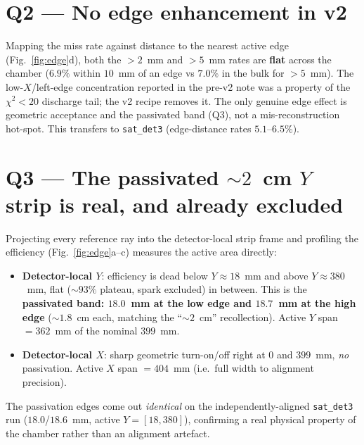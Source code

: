 \documentclass[11pt]{article}
\begin{document}
\section{Q2 --- No edge enhancement in v2}
Mapping the miss rate against distance to the nearest active edge (Fig.~\ref{fig:edge}d), both
the $>\!2$~mm and $>\!5$~mm rates are \textbf{flat} across the chamber ($6.9\%$ within $10$~mm of
an edge vs $7.0\%$ in the bulk for $>\!5$~mm). The low-$X$/left-edge concentration reported in
the pre-v2 note was a property of the $\chi^2<20$ discharge tail; the v2 recipe removes it. The
only genuine edge effect is geometric acceptance and the passivated band (Q3), not a
mis-reconstruction hot-spot. This transfers to \texttt{sat\_det3} (edge-distance rates
$5.1$--$6.5\%$).

\section{Q3 --- The passivated $\sim2$~cm $Y$ strip is real, and already excluded}
Projecting every reference ray into the detector-local strip frame and profiling the efficiency
(Fig.~\ref{fig:edge}a--c) measures the active area directly:
%
\begin{itemize}\setlength\itemsep{0.1em}
  \item \textbf{Detector-local $Y$}: efficiency is dead below $Y\approx18$~mm and above
        $Y\approx380$~mm, flat ($\sim93\%$ plateau, spark excluded) in between. This is the
        \textbf{passivated band: $18.0$~mm at the low edge and $18.7$~mm at the high edge}
        ($\sim1.8$~cm each, matching the ``$\sim2$~cm'' recollection). Active $Y$ span
        $= 362$~mm of the nominal $399$~mm.
  \item \textbf{Detector-local $X$}: sharp geometric turn-on/off right at $0$ and $399$~mm,
        \emph{no} passivation. Active $X$ span $= 404$~mm (i.e.\ full width to alignment
        precision).
\end{itemize}
%
The passivation edges come out \emph{identical} on the independently-aligned \texttt{sat\_det3}
run ($18.0$/$18.6$~mm, active $Y=[18,380]$), confirming a real physical property of the
chamber rather than an alignment artefact.
\end{document}
